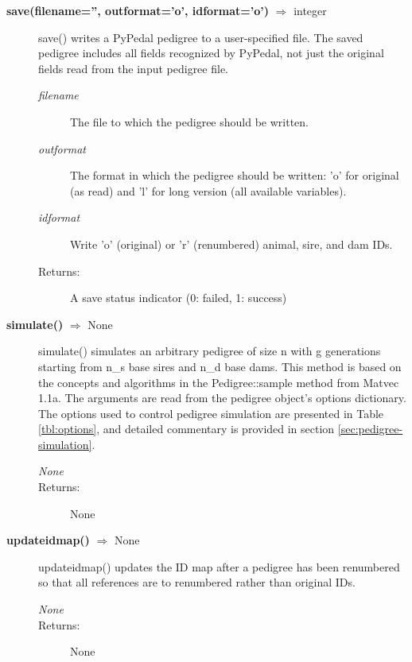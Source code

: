 \begin{description}
\item[\textbf{save(filename='', outformat='o', idformat='o')} $\Rightarrow$ integer]
save() writes a PyPedal pedigree to a user-specified file. The saved pedigree includes all fields recognized by PyPedal, not just the original fields read from the input pedigree file.
\begin{description}
\item[\emph{filename}] The file to which the pedigree should be written.
\item[\emph{outformat}] The format in which the pedigree should be written: 'o' for original (as read) and 'l' for long version (all available variables).
\item[\emph{idformat}] Write 'o' (original) or 'r' (renumbered) animal, sire, and dam IDs.
\item[Returns:] A save status indicator (0: failed, 1: success)
\end{description}

\item[\textbf{simulate()} $\Rightarrow$ None]
simulate() simulates an arbitrary pedigree of size n with g generations starting from n\_s base sires and n\_d base dams. This method is based on the concepts and algorithms in the Pedigree::sample method from Matvec 1.1a. The arguments are read from the pedigree object's options dictionary. The options used to control pedigree simulation are presented in Table \ref{tbl:options}, and detailed commentary is provided in section \ref{sec:pedigree-simulation}.
\begin{description}
\item[\emph{None}]
\item[Returns:] None
\end{description}

\item[\textbf{updateidmap()} $\Rightarrow$ None]
updateidmap() updates the ID map after a pedigree has been renumbered so that all references are to renumbered rather than original IDs.
\begin{description}
\item[\emph{None}]
\item[Returns:] None
\end{description}

\end{description}

